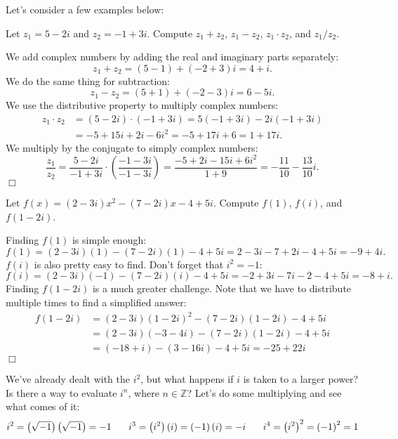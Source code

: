 \documentclass[lang=en,11pt]{elegantbook}
\begin{document}
\noindent Let's consider a few examples below:
\begin{example}
Let $z_1=5-2i$ and $z_2=-1+3i$.  Compute $z_1+z_2$, $z_1-z_2$, $z_1\cdot z_2$, and $z_1/z_2$.
\end{example}
\begin{solution}
We add complex numbers by adding the real and imaginary parts separately: $$z_1+z_2=\left(5-1\right)+\left(-2+3\right)i=4+i.$$
We do the same thing for subtraction:
$$z_1-z_2=\left(5+1\right)+\left(-2-3\right)i=6-5i.$$
We use the distributive property to multiply complex numbers: \begin{align*}
    z_1\cdot z_2&=\left(5-2i\right)\cdot\left(-1+3i\right)=5\left(-1+3i\right)-2i\left(-1+3i\right) \\
    &=-5+15i+2i-6i^2=-5+17i+6=1+17i.
\end{align*}
We multiply by the conjugate to simply complex numbers:
$$\frac{z_1}{z_2}=\frac{5-2i}{-1+3i}\cdot\left(\frac{-1-3i}{-1-3i}\right)=\frac{-5+2i-15i+6i^2}{1+9}=-\frac{11}{10}-\frac{13}{10}i.$$$\Box$
\end{solution}
\begin{example}
Let $f(x)=\left(2-3i\right)x^2-\left(7-2i\right)x-4+5i$.  Compute $f(1)$, $f(i)$, and $f(1-2i)$.
\end{example}
\begin{solution}
Finding $f(1)$ is simple enough:
$$f(1)=\left(2-3i\right)(1)-\left(7-2i\right)(1)-4+5i=2-3i-7+2i-4+5i=-9+4i.$$
$f(i)$ is also pretty easy to find.  Don't forget that $i^2=-1$:
$$f(i)=\left(2-3i\right)(-1)-\left(7-2i\right)(i)-4+5i=-2+3i-7i-2-4+5i=-8+i.$$
Finding $f(1-2i)$ is a much greater challenge.  Note that we have to distribute multiple times to find a simplified answer: \begin{align*}
   f(1-2i)&=\left(2-3i\right)\left(1-2i\right)^2-\left(7-2i\right)\left(1-2i\right)-4+5i \\
   &=\left(2-3i\right)\left(-3-4i\right)-\left(7-2i\right)\left(1-2i\right)-4+5i \\
   &= \left(-18+i\right)-\left(3-16i\right)-4+5i = -25+22i
\end{align*}$\Box$
\end{solution}
\noindent We've already dealt with the $i^2$, but what happens if $i$ is taken to a larger power?  Is there a way to evaluate $i^n$, where $n\in\mathbb{Z}$?  Let's do some multiplying and see what comes of it:
$$i^2=\left(\sqrt{-1}\right)\left(\sqrt{-1}\right)=-1 \hspace{0.25in} i^3=\left(i^2\right)(i)=\left(-1\right)(i)=-i \hspace{0.25in} i^4=\left(i^2\right)^2=\left(-1\right)^2=1$$
\end{document}
